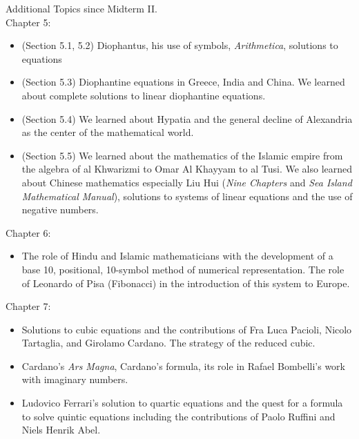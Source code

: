 \documentclass[11pt,fleqn]{article}
\begin{document}
Additional Topics since Midterm II.\\

Chapter 5:\\
\begin{itemize}
\item (Section 5.1, 5.2) Diophantus, his use of symbols, \emph{Arithmetica}, solutions to equations
\item (Section 5.3) Diophantine equations in Greece, India and China. We learned about complete solutions to linear diophantine equations.
\item (Section 5.4) We learned about Hypatia and the general decline of Alexandria as the center of the mathematical world.
\item (Section 5.5) We learned about the mathematics of the Islamic empire from the algebra of al Khwarizmi to Omar Al Khayyam to al Tusi.  We also learned about Chinese mathematics especially Liu Hui (\emph{Nine Chapters} and \emph{Sea Island Mathematical Manual}), solutions to systems of linear equations and the use of negative numbers. 
\end{itemize}

Chapter 6:\\
\begin{itemize}
\item The role of Hindu and Islamic mathematicians with the development of a base 10, positional, 10-symbol method of numerical representation. The role of Leonardo of Pisa (Fibonacci) in the introduction of this system to Europe.
\end{itemize}

Chapter 7:\\
\begin{itemize}
\item Solutions to cubic equations and the contributions of Fra Luca Pacioli, Nicolo Tartaglia, and Girolamo Cardano. The strategy of the reduced cubic.
\item Cardano's \emph{Ars Magna}, Cardano's formula,  its role in Rafael Bombelli's work with imaginary numbers.
\item Ludovico Ferrari's solution to quartic equations and the quest for a formula to solve quintic equations including the contributions of Paolo Ruffini and Niels Henrik Abel.
\end{itemize}
\end{document}
